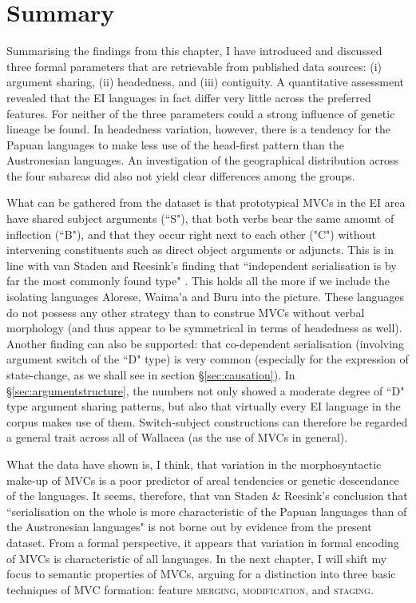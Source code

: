 \section{Summary}

Summarising the findings from this chapter, I have introduced and discussed three formal parameters that are retrievable from published data sources: (i) argument sharing, (ii) headedness, and (iii) contiguity. A quantitative assessment revealed that the EI languages in fact differ very little across the preferred features. For neither of the three parameters could a strong influence of genetic lineage be found. In headedness variation, however, there is a tendency for the Papuan languages to make less use of the head-first pattern than the Austronesian languages. An investigation of the geographical distribution across the four subareas did also not yield clear differences among the groups.

What can be gathered from the dataset is that prototypical MVCs in the EI area have shared subject arguments (``S"), that both verbs bear the same amount of inflection (``B"), and that they occur right next to each other ("C") without intervening constituents such as direct object arguments or adjuncts. This is in line with van Staden and Reesink's finding that ``independent serialisation is by far the most commonly found type" \citep[48]{vanstaden2008serial}. This holds all the more if we include the isolating languages Alorese, Waima'a and Buru into the picture. These languages do not possess any other strategy than to construe MVCs without verbal morphology (and thus appear to be symmetrical in terms of headedness as well). Another finding can also be supported: that co-dependent serialisation (involving argument switch of the ``D" type) is very common (especially for the expression of state-change, as we shall see in section §\ref{sec:causation}). In §\ref{sec:argumentstructure}, the numbers not only showed a moderate degree of ``D" type argument sharing patterns, but also that virtually every EI language in the corpus makes use of them. Switch-subject constructions can therefore be regarded a general trait across all of Wallacea (as the use of MVCs in general).

What the data have shown is, I think, that variation in the morphosyntactic make-up of MVCs is a poor predictor of areal tendencies or genetic descendance of the languages. It seems, therefore, that van Staden \& Reesink's conclusion that ``serialisation on the whole is more characteristic of the Papuan languages than of the Austronesian languages" \citep[50]{vanstaden2008serial} is not borne out by evidence from the present dataset. From a formal perspective, it appears that variation in formal encoding of MVCs is characteristic of all languages. In the next chapter, I will shift my focus to semantic properties of MVCs, arguing for a distinction into three basic techniques of MVC formation: feature \textsc{merging}, \textsc{modification}, and \textsc{staging}.